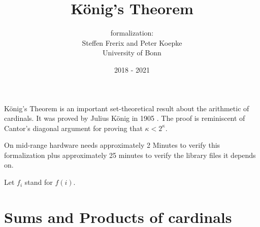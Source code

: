 \documentclass{article}
\title{König's Theorem}
\author{\Naproche formalization: \vspace{0.5em} \\
Steffen Frerix and Peter Koepke \\
University of Bonn}
\date{2018 - 2021}
\begin{document}
\maketitle

\noindent König's Theorem is an important set-theoretical result about the
arithmetic of cardinals.
It was proved by Julius König in 1905 \cite[p. 177--180]{Koenig1905}.
The proof is reminiscent of Cantor's diagonal argument for proving that
$\kappa < 2^\kappa$.

On mid-range hardware \Naproche needs approximately 2 Minutes to verify this
formalization plus approximately 25 minutes to verify the library files it
depends on.

\begin{forthel}

  Let $f_{i}$ stand for $f(i)$.
\end{forthel}


\section*{Sums and Products of cardinals}
\end{document}
